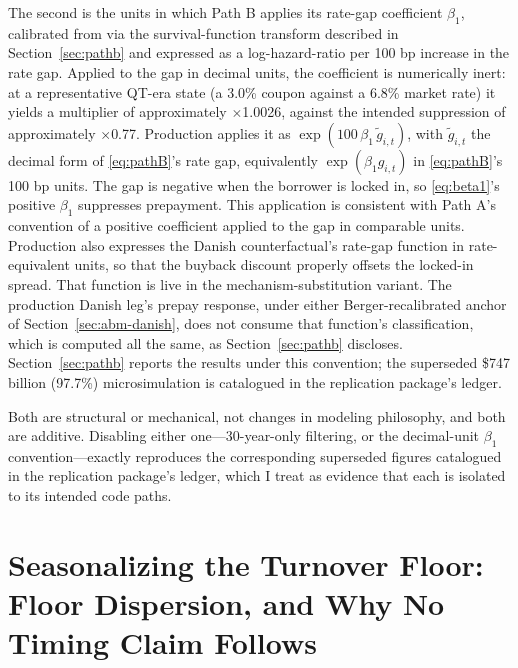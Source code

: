 \documentclass[12pt]{article}
\begin{document}
The second is the units in which Path B applies its rate-gap coefficient $\beta_1$, calibrated from \citet{liebersohn2024} via the survival-function transform described in Section~\ref{sec:pathb} and expressed as a log-hazard-ratio per 100 bp increase in the rate gap. Applied to the gap in decimal units, the coefficient is numerically inert: at a representative QT-era state (a 3.0\% coupon against a 6.8\% market rate) it yields a multiplier of approximately $\times$1.0026, against the intended suppression of approximately $\times$0.77. Production applies it as $\exp(100\,\beta_1\,\tilde g_{i,t})$, with $\tilde g_{i,t}$ the decimal form of \eqref{eq:pathB}'s rate gap, equivalently $\exp(\beta_1 g_{i,t})$ in \eqref{eq:pathB}'s 100 bp units. The gap is negative when the borrower is locked in, so \eqref{eq:beta1}'s positive $\beta_1$ suppresses prepayment. This application is consistent with Path A's convention of a positive coefficient applied to the gap in comparable units. Production also expresses the Danish counterfactual's rate-gap function in rate-equivalent units, so that the buyback discount properly offsets the locked-in spread. That function is live in the mechanism-substitution variant. The production Danish leg's prepay response, under either Berger-recalibrated anchor of Section~\ref{sec:abm-danish}, does not consume that function's classification, which is computed all the same, as Section~\ref{sec:pathb} discloses. Section~\ref{sec:pathb} reports the results under this convention; the superseded \$747 billion (97.7\%) microsimulation is catalogued in the replication package's ledger.

Both are structural or mechanical, not changes in modeling philosophy, and both are additive. Disabling either one---30-year-only filtering, or the decimal-unit $\beta_1$ convention---exactly reproduces the corresponding superseded figures catalogued in the replication package's ledger, which I treat as evidence that each is isolated to its intended code paths.

\section{Seasonalizing the Turnover Floor: Floor Dispersion, and Why No Timing Claim Follows}\label{sec:robustness-seasonalfloor}
\end{document}
